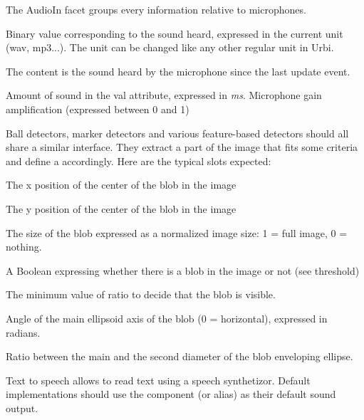 
The AudioIn facet groups every information relative to microphones.

\begin{slots}
  {%
    Binary value corresponding to the sound heard, expressed in the
    current unit (wav, mp3...). The unit can be changed like any other
    regular unit in Urbi.

    The content is the sound heard by the microphone since the last
    update event.%
  }
  {%
    Amount of sound in the val attribute, expressed in \textit{ms}.%
  }
  {%
    Microphone gain amplification (expressed between 0 and 1)%
  }
\end{slots}



Ball detectors, marker detectors and various feature-based detectors
should all share a similar interface. They extract a part of the image
that fits some criteria and define a  accordingly. Here are
the typical slots expected:

\begin{slots}
  {%
    The x position of the center of the blob in the image%
  }

  {%
    The y position of the center of the blob in the image%
  }

  {%
    The size of the blob expressed as a normalized image size: 1 =
    full image, 0 = nothing.%
  }

  {%
    A Boolean expressing whether there is a blob in the image or not
    (see threshold)%
  }

  {%
    The minimum value of ratio to decide that the blob is visible.%
  }

  {%
    Angle of the main ellipsoid axis of the blob (0 = horizontal),
    expressed in radians.%
  }

  {%
    Ratio between the main and the second diameter of the blob
    enveloping ellipse.%
  }

\end{slots}

Text to speech allows to read text using a speech synthetizor. Default
implementations should use the  component (or alias) as
their default sound output.

